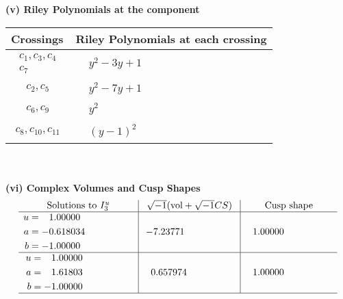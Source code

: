 \documentclass[1p]{elsarticle_modified}
\theoremstyle{definition}
\newcommand{\I}{\sqrt{-1}}
\begin{document}
\newpage\renewcommand{\arraystretch}{1}
\flushleft \textbf{(v) Riley Polynomials at the component}\newline \\
\begin{tabular}{m{50pt}|m{274pt}}
Crossings & \hspace{64pt}Riley Polynomials at each crossing \\
\hline $$\begin{aligned}c_{1},c_{3},c_{4}\\c_{7}\end{aligned}$$&$\begin{aligned}
&y^2-3 y+1
\end{aligned}$\\
\hline $$\begin{aligned}c_{2},c_{5}\end{aligned}$$&$\begin{aligned}
&y^2-7 y+1
\end{aligned}$\\
\hline $$\begin{aligned}c_{6},c_{9}\end{aligned}$$&$\begin{aligned}
&y^2
\end{aligned}$\\
\hline $$\begin{aligned}c_{8},c_{10},c_{11}\end{aligned}$$&$\begin{aligned}
&(y-1)^2
\end{aligned}$\\
\hline
\end{tabular}\\~\\
\newpage\flushleft \textbf{(vi) Complex Volumes and Cusp Shapes}
$$\begin{array}{c|c|c}  
\text{Solutions to }I^u_{3}& \I (\text{vol} + \sqrt{-1}CS) & \text{Cusp shape}\\
 \hline 
\begin{aligned}
u &= \phantom{-}1.00000\phantom{ +0.000000I} \\
a &= -0.618034\phantom{ +0.000000I} \\
b &= -1.00000\phantom{ +0.000000I}\end{aligned}
 & -7.23771\phantom{ +0.000000I} & \phantom{-}1.00000\phantom{ +0.000000I} \\ \hline\begin{aligned}
u &= \phantom{-}1.00000\phantom{ +0.000000I} \\
a &= \phantom{-}1.61803\phantom{ +0.000000I} \\
b &= -1.00000\phantom{ +0.000000I}\end{aligned}
 & \phantom{-}0.657974\phantom{ +0.000000I} & \phantom{-}1.00000\phantom{ +0.000000I}\\
 \hline 
 \end{array}$$\newpage
\end{document}
